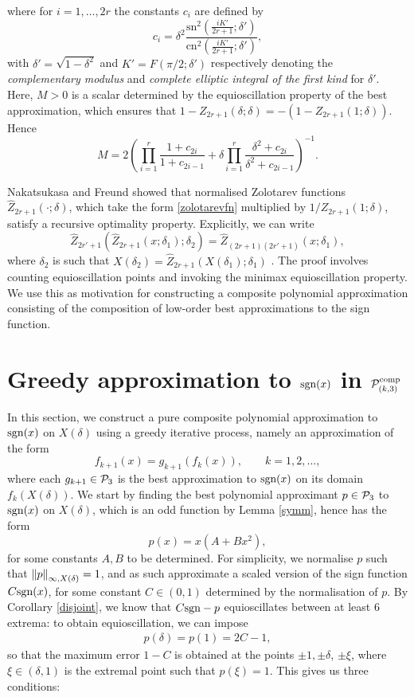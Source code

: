where for $i=1,\dots,2r$ the constants $c_i$ are defined by
\[c_i=\delta^2 \dfrac{\text{sn}^2\left(\frac{iK'}{2r+1};\delta'\right)}{\text{cn}^2\left(\frac{iK'}{2r+1};\delta'\right)},\]
with $\delta'=\sqrt{1-\delta^2}$ and $K'=F(\pi/2;\delta')$ respectively denoting the \textit{complementary modulus} and \textit{complete elliptic integral of the first kind} for $\delta'$. Here, $M>0$ is a scalar determined by the equioscillation property of the best approximation, which ensures that $1-Z_{2r+1}(\delta;\delta)=-(1-Z_{2r+1}(1;\delta))$. Hence
\[M=2\left(\prod_{i=1}^r\dfrac{1+c_{2i}}{1+c_{2i-1}}+\delta \prod_{i=1}^r\dfrac{\delta^2+c_{2i}}{\delta^2 +c_{2i-1}}\right)^{-1}.\]

Nakatsukasa and Freund showed that normalised Zolotarev functions $\hat{Z}_{2r+1}(\cdot;\delta)$, which take the form \eqref{zolotarevfn} multiplied by $1/Z_{2r+1}(1;\delta)$, satisfy a recursive optimality property. Explicitly, we can write
\[\hat{Z}_{2r'+1}(\hat{Z}_{2r+1}(x;\delta_1);\delta_2) = \hat{Z}_{(2r+1)(2r'+1)}(x;\delta_1),\]
where $\delta_2$ is such that $X(\delta_2)=\hat{Z}_{2r+1}(X(\delta_1);\delta_1)$ \cite[Theorem 3]{YujiZolotFreund}. The proof involves counting equioscillation points and invoking the minimax equioscillation property. We use this as motivation for constructing a composite polynomial approximation consisting of the composition of low-order best approximations to the sign function.

\section{Greedy approximation to \texorpdfstring{$\text{sgn}(x)$}{sgn x} in \texorpdfstring{$\mathcal{P}_{(k,3)}^{\text{comp}}$}{P k,3 comp}}

In this section, we construct a pure composite polynomial approximation to $\text{sgn}(x)$ on $X(\delta)$ using a greedy iterative process, namely an approximation of the form
\[f_{k+1}(x) = g_{k+1}(f_{k}(x)), \qquad k=1,2,\dots,\]
where each $g_{k+1} \in \mathcal{P}_3$ is the best approximation to $\text{sgn}(x)$ on its domain $f_{k}(X(\delta))$. We start by finding the best polynomial approximant $p \in \mathcal{P}_3$ to $\text{sgn}(x)$ on $X(\delta)$, which is an odd function by Lemma \ref{symm}, hence has the form
\[p(x)=x(A+Bx^2),\]
for some constants $A,B$ to be determined. For simplicity, we normalise $p$ such that $\left\lVert p\right\rVert_{\infty,X(\delta)}=1$, and as such approximate a scaled version of the sign function $C\text{sgn}(x)$, for some constant $C \in (0,1)$ determined by the normalisation of $p$. By Corollary \ref{disjoint}, we know that $C\text{sgn} -p$ equioscillates between at least 6 extrema: to obtain equioscillation, we can impose
\begin{align}
    p(\delta)=p(1)=2C-1, \label{valueofC}
\end{align}
so that the maximum error $1-C$ is obtained at the points  $\pm 1, \pm \delta$, $\pm \xi$, where $\xi \in (\delta,1)$ is the extremal point such that $p(\xi)=1$. This gives us three conditions:

